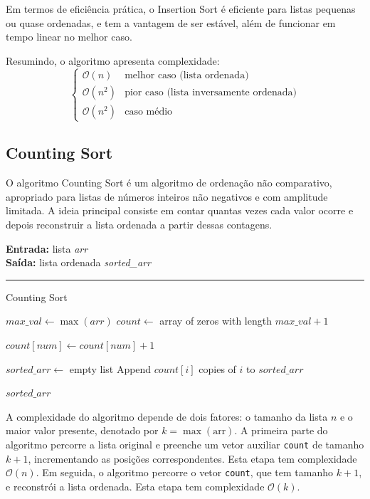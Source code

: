 \documentclass[conference]{IEEEtran}
\begin{document}
Em termos de eficiência prática, o Insertion Sort é eficiente para listas pequenas ou quase ordenadas, e tem a vantagem de ser estável, além de funcionar em tempo linear no melhor caso.

Resumindo, o algoritmo apresenta complexidade:
\[
\begin{cases}
\mathcal{O}(n) & \text{melhor caso (lista ordenada)} \\
\mathcal{O}(n^2) & \text{pior caso (lista inversamente ordenada)} \\
\mathcal{O}(n^2) & \text{caso médio}
\end{cases}
\]

\subsection{Counting Sort}

O algoritmo Counting Sort é um algoritmo de ordenação não comparativo, apropriado para listas de números inteiros não negativos e com amplitude limitada. A ideia principal consiste em contar quantas vezes cada valor ocorre e depois reconstruir a lista ordenada a partir dessas contagens.

\begin{algorithm}[H]
    \raggedright
    \vspace{.1em}
    \textbf{Entrada:} lista \textit{arr} \\
    \textbf{Saída:} lista ordenada \textit{sorted\_arr} \\
    \vspace{.5em}
    \hrule 
    \caption{Counting Sort}
    \begin{algorithmic}[1]
        \State $max\_val \gets \max(arr)$
        \State $count \gets$ array of zeros with length $max\_val + 1$
        
            \State $count[num] \gets count[num] + 1$
        \EndFor
    
        \State $sorted\_arr \gets$ empty list
                \State Append $count[i]$ copies of $i$ to $sorted\_arr$
            \EndIf
        \EndFor
    
        \State \Return $sorted\_arr$
    \end{algorithmic}
\end{algorithm}

A complexidade do algoritmo depende de dois fatores: o tamanho da lista \( n \) e o maior valor presente, denotado por \( k = \max(\text{arr}) \). A primeira parte do algoritmo percorre a lista original e preenche um vetor auxiliar \texttt{count} de tamanho \( k + 1 \), incrementando as posições correspondentes. Esta etapa tem complexidade \(\mathcal{O}(n)\). Em seguida, o algoritmo percorre o vetor \texttt{count}, que tem tamanho \( k + 1 \), e reconstrói a lista ordenada. Esta etapa tem complexidade \(\mathcal{O}(k)\).
\end{document}
